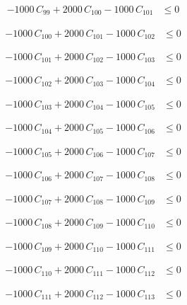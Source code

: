 \documentclass[a4paper,11pt]{article}
\begin{document}
\begin{align}
-1000\,C_{99} + 2000\,C_{100} - 1000\,C_{101} &\leq 0 \nonumber
\end{align}

\begin{align}
-1000\,C_{100} + 2000\,C_{101} - 1000\,C_{102} &\leq 0 \nonumber
\end{align}

\begin{align}
-1000\,C_{101} + 2000\,C_{102} - 1000\,C_{103} &\leq 0 \nonumber
\end{align}

\begin{align}
-1000\,C_{102} + 2000\,C_{103} - 1000\,C_{104} &\leq 0 \nonumber
\end{align}

\begin{align}
-1000\,C_{103} + 2000\,C_{104} - 1000\,C_{105} &\leq 0 \nonumber
\end{align}

\begin{align}
-1000\,C_{104} + 2000\,C_{105} - 1000\,C_{106} &\leq 0 \nonumber
\end{align}

\begin{align}
-1000\,C_{105} + 2000\,C_{106} - 1000\,C_{107} &\leq 0 \nonumber
\end{align}

\begin{align}
-1000\,C_{106} + 2000\,C_{107} - 1000\,C_{108} &\leq 0 \nonumber
\end{align}

\begin{align}
-1000\,C_{107} + 2000\,C_{108} - 1000\,C_{109} &\leq 0 \nonumber
\end{align}

\begin{align}
-1000\,C_{108} + 2000\,C_{109} - 1000\,C_{110} &\leq 0 \nonumber
\end{align}

\begin{align}
-1000\,C_{109} + 2000\,C_{110} - 1000\,C_{111} &\leq 0 \nonumber
\end{align}

\begin{align}
-1000\,C_{110} + 2000\,C_{111} - 1000\,C_{112} &\leq 0 \nonumber
\end{align}

\begin{align}
-1000\,C_{111} + 2000\,C_{112} - 1000\,C_{113} &\leq 0 \nonumber
\end{align}
\end{document}
